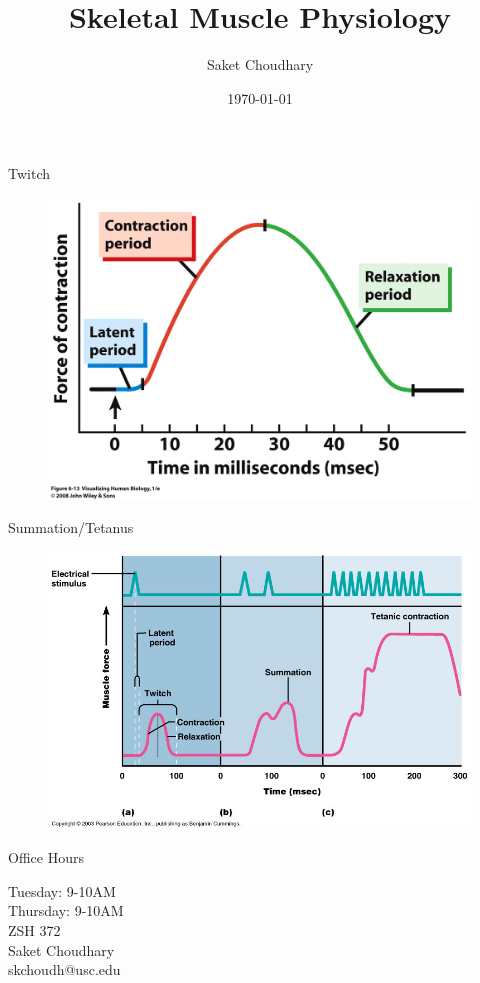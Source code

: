 \documentclass[10pt]{beamer}
\title{Skeletal Muscle Physiology}
\date{\today}
\author{Saket Choudhary}
\institute{BISC 104\\Session 3}
\begin{document}
\maketitle

\begin{frame}[fragile]{Twitch}
 \begin{figure}
\includegraphics[width=\linewidth]{twitch0}
\end{figure}
\end{frame}

\begin{frame}[fragile]{Summation/Tetanus}
 \begin{figure}
\includegraphics[width=\linewidth]{twitch}
\end{figure}
\end{frame}

\begin{frame}[fragile]{Office Hours}
\Large \begin{center}Tuesday: 9-10AM\\
Thursday: 9-10AM\\
ZSH 372\\
\vspace*{2cm}
Saket Choudhary\\ 
skchoudh@usc.edu\\
\end{center}


\end{frame}
\end{document}
